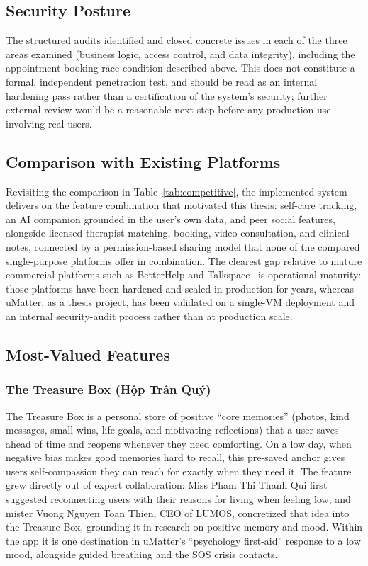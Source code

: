\subsection{Security Posture}

The structured audits identified and closed concrete issues in each of the three areas examined (business logic, access control, and data integrity), including the appointment-booking race condition described above. This does not constitute a formal, independent penetration test, and should be read as an internal hardening pass rather than a certification of the system's security; further external review would be a reasonable next step before any production use involving real users.

\subsection{Comparison with Existing Platforms}

Revisiting the comparison in Table~\ref{tab:competitive}, the implemented system delivers on the feature combination that motivated this thesis: self-care tracking, an AI companion grounded in the user's own data, and peer social features, alongside licensed-therapist matching, booking, video consultation, and clinical notes, connected by a permission-based sharing model that none of the compared single-purpose platforms offer in combination. The clearest gap relative to mature commercial platforms such as BetterHelp and Talkspace~\cite{BetterHelp,Talkspace} is operational maturity: those platforms have been hardened and scaled in production for years, whereas uMatter, as a thesis project, has been validated on a single-VM deployment and an internal security-audit process rather than at production scale.

\subsection{Most-Valued Features}
\label{sec:most-valued}

\subsubsection{The Treasure Box (Hộp Trân Quý)}

The Treasure Box is a personal store of positive ``core memories'' (photos, kind messages, small wins, life goals, and motivating reflections) that a user saves ahead of time and reopens whenever they need comforting. On a low day, when negative bias makes good memories hard to recall, this pre-saved anchor gives users self-compassion they can reach for exactly when they need it. The feature grew directly out of expert collaboration: Miss Pham Thi Thanh Qui first suggested reconnecting users with their reasons for living when feeling low, and mister Vuong Nguyen Toan Thien, CEO of LUMOS, concretized that idea into the Treasure Box, grounding it in research on positive memory and mood. Within the app it is one destination in uMatter's ``psychology first-aid'' response to a low mood, alongside guided breathing and the SOS crisis contacts.

